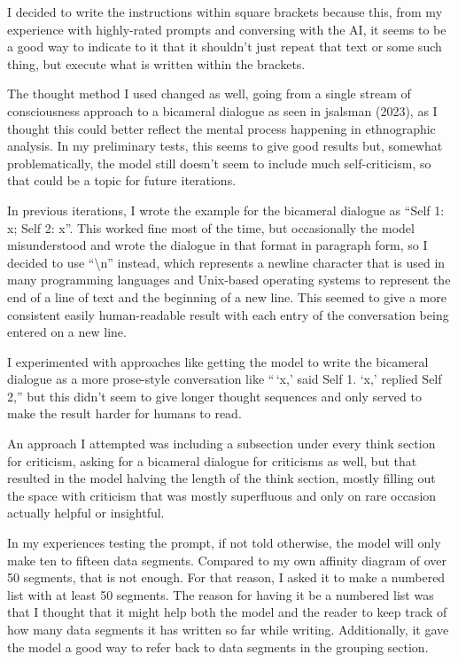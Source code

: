 \documentclass[
]{book}
\begin{document}
I decided to write the instructions within square brackets because this, from my experience with highly-rated prompts and conversing with the AI, it seems to be a good way to indicate to it that it shouldn't just repeat that text or some such thing, but execute what is written within the brackets.

The thought method I used changed as well, going from a single stream of consciousness approach to a bicameral dialogue as seen in jsalsman (2023), as I thought this could better reflect the mental process happening in ethnographic analysis. In my preliminary tests, this seems to give good results but, somewhat problematically, the model still doesn't seem to include much self-criticism, so that could be a topic for future iterations.

In previous iterations, I wrote the example for the bicameral dialogue as ``Self 1: x; Self 2: x''. This worked fine most of the time, but occasionally the model misunderstood and wrote the dialogue in that format in paragraph form, so I decided to use ``\textbackslash n'' instead, which represents a newline character that is used in many programming languages and Unix-based operating systems to represent the end of a line of text and the beginning of a new line. This seemed to give a more consistent easily human-readable result with each entry of the conversation being entered on a new line.

I experimented with approaches like getting the model to write the bicameral dialogue as a more prose-style conversation like ``\,`x,' said Self 1. `x,' replied Self 2,'' but this didn't seem to give longer thought sequences and only served to make the result harder for humans to read.

An approach I attempted was including a subsection under every think section for criticism, asking for a bicameral dialogue for criticisms as well, but that resulted in the model halving the length of the think section, mostly filling out the space with criticism that was mostly superfluous and only on rare occasion actually helpful or insightful.

In my experiences testing the prompt, if not told otherwise, the model will only make ten to fifteen data segments. Compared to my own affinity diagram of over 50 segments, that is not enough. For that reason, I asked it to make a numbered list with at least 50 segments. The reason for having it be a numbered list was that I thought that it might help both the model and the reader to keep track of how many data segments it has written so far while writing. Additionally, it gave the model a good way to refer back to data segments in the grouping section.
\end{document}
